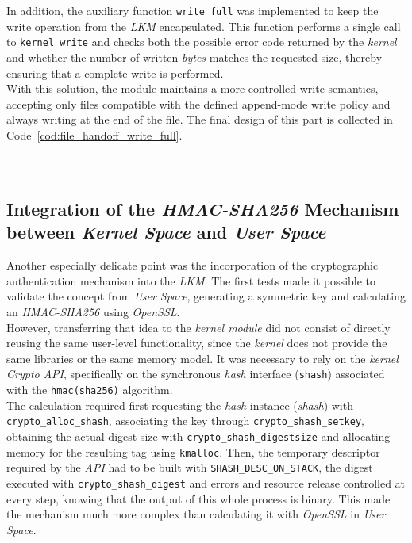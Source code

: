 In addition, the auxiliary function \verb|write_full| was implemented to keep the write operation from the \textit{LKM} encapsulated.
This function performs a single call to \verb|kernel_write| and checks both the possible error code returned by the \textit{kernel} and whether the number of written \textit{bytes} matches the requested size, thereby ensuring that a complete write is performed.\\

With this solution, the module maintains a more controlled write semantics, accepting only files compatible with the defined append-mode write policy and always writing at the end of the file.
The final design of this part is collected in Code~\ref{cod:file_handoff_write_full}.\\\\

\

\subsection{Integration of the \textit{HMAC-SHA256} Mechanism between \textit{Kernel Space} and \textit{User Space}}

Another especially delicate point was the incorporation of the cryptographic authentication mechanism into the \textit{LKM}.
The first tests made it possible to validate the concept from \textit{User Space}, generating a symmetric key and calculating an \textit{HMAC-SHA256} using \textit{OpenSSL}.\\

However, transferring that idea to the \textit{kernel module} did not consist of directly reusing the same user-level functionality, since the \textit{kernel} does not provide the same libraries or the same memory model.
It was necessary to rely on the \textit{kernel Crypto API}, specifically on the synchronous \textit{hash} interface (\texttt{shash}) associated with the \texttt{hmac(sha256)} algorithm.\\

The calculation required first requesting the \textit{hash} instance (\textit{shash}) with \verb|crypto_alloc_shash|, associating the key through \verb|crypto_shash_setkey|, obtaining the actual digest size with \verb|crypto_shash_digestsize| and allocating memory for the resulting tag using \verb|kmalloc|.
Then, the temporary descriptor required by the \textit{API} had to be built with \verb|SHASH_DESC_ON_STACK|, the digest executed with \verb|crypto_shash_digest| and errors and resource release controlled at every step, knowing that the output of this whole process is binary.
This made the mechanism much more complex than calculating it with \textit{OpenSSL} in \textit{User Space}.\\

